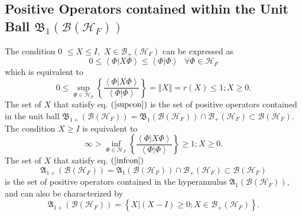 \documentclass[aps,preprint]{revtex4}%
\begin{document}
\subsection{Positive Operators contained within the Unit Ball $\mathfrak{B}%
_{1}\left(  \mathcal{B}\left(  \mathcal{H}_{F}\right)  \right)  $}

The condition $0$ $\leq X\leq I,$ $X\in\mathcal{B}_{+}\left(  \mathcal{H}%
_{F}\right)  $ can be expressed as
\begin{equation}
0\leq\left\langle \left.  \Phi\right\vert X\Phi\right\rangle \leq\left\langle
\left.  \Phi\right\vert \Phi\right\rangle \text{ }\forall\Phi\in
\mathcal{H}_{F}%
\end{equation}
which is equivalent to
\begin{equation}
0\leq\sup_{\Phi\in\mathcal{H}_{F}}\left\{  \frac{\left\langle \left.
\Phi\right\vert X\Phi\right\rangle }{\left\langle \left.  \Phi\right\vert
\Phi\right\rangle }\right\}  =\left\Vert X\right\Vert =r\left(  X\right)
\leq1;X\geq0. \label{supcon}%
\end{equation}
The set of $X$ that satisfy eq. $\left(  \ref{supcon}\right)  $ is the set of
positive operators contained in the unit ball $\mathfrak{B}_{1+}\left(
\mathcal{B}\left(  \mathcal{H}_{F}\right)  \right)  =\mathfrak{B}_{1}\left(
\mathcal{B}\left(  \mathcal{H}_{F}\right)  \right)  \cap\mathcal{B}_{+}\left(
\mathcal{H}_{F}\right)  \subset\mathcal{B}\left(  \mathcal{H}_{F}\right)  .$
The condition $X\geq I$ is equivalent to
\begin{equation}
\infty>\inf_{\Phi\in\mathcal{H}_{F}}\left\{  \frac{\left\langle \left.
\Phi\right\vert X\Phi\right\rangle }{\left\langle \left.  \Phi\right\vert
\Phi\right\rangle }\right\}  \geq1;X\geq0. \label{infcon}%
\end{equation}
The set of $X$ that satisfy eq. $\left(  \ref{infcon}\right)  $%
\begin{equation}
\mathfrak{A}_{1+}\left(  \mathcal{B}\left(  \mathcal{H}_{F}\right)  \right)
=\mathfrak{A}_{1}\left(  \mathcal{B}\left(  \mathcal{H}_{F}\right)  \right)
\cap\mathcal{B}_{+}\left(  \mathcal{H}_{F}\right)  \subset\mathcal{B}\left(
\mathcal{H}_{F}\right)
\end{equation}
is the set of positive operators contained in the hyperannulus $\mathfrak{A}%
_{1}\left(  \mathcal{B}\left(  \mathcal{H}_{F}\right)  \right)  ,$ and can
also be characterized by
\begin{equation}
\mathfrak{A}_{1+}\left(  \mathcal{B}\left(  \mathcal{H}_{F}\right)  \right)
=\left\{  \left.  X\right\vert \left(  X-I\right)  \geq0;X\in\mathcal{B}%
_{+}\left(  \mathcal{H}_{F}\right)  \right\}  .
\end{equation}
\end{document}
